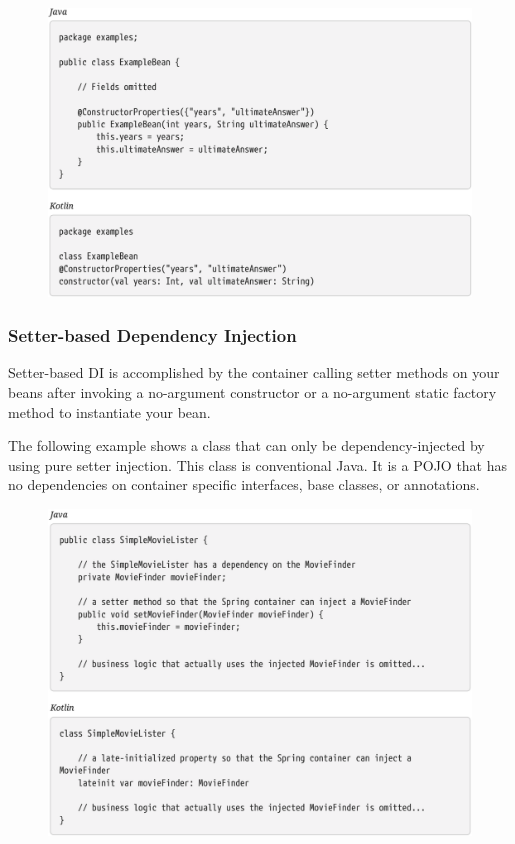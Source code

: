 \begin{figure}[ht]
    \centering
    \includegraphics[width=1\linewidth]{./Figure/IMG_code_30.png}
\end{figure}

\subsubsection{Setter-based Dependency Injection}
Setter-based DI is accomplished by the container calling setter methods on your beans after
invoking a no-argument constructor or a no-argument static factory method to instantiate your
bean.

The following example shows a class that can only be dependency-injected by using pure setter
injection. This class is conventional Java. It is a POJO that has no dependencies on container specific
interfaces, base classes, or annotations.


\begin{figure}[ht]
    \centering
    \includegraphics[width=1\linewidth]{./Figure/IMG_code_31.png}
\end{figure}


